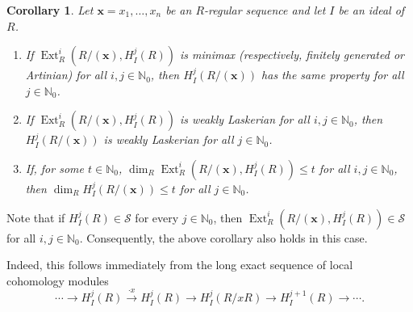 \documentclass[12pt,twoside, final]{amsart}
\numberwithin{equation}{section}
\newtheorem{corollary}[theorem]{Corollary}
\theoremstyle{definition}
\newcommand{\Ext}{\operatorname{Ext}}
\newcommand{\NN}{\mathbb N_0}
\begin{document}
\begin{corollary}
Let $\mathbf x=x_1,\ldots,x_n$ be an $R$-regular sequence and let
$I$ be an ideal of $R$.

\begin{enumerate}%
\item If 
$\Ext_R^i(R/(\mathbf x),H_I^j(R))$ 
is minimax (respectively, finitely generated or Artinian) for all
$i,j\in\NN$, then 
$H_I^j(R/(\mathbf x))$  
has the same property for all $j\in\NN$.

\item If 
$\Ext_R^i(R/(\mathbf x),H_I^j(R))$ 
is weakly Laskerian for all $i,j\in\NN$, then 
$H_I^j(R/(\mathbf x))$ 
is weakly Laskerian for all $j\in\NN$.

\item If, for some $t\in\NN$,  
$\dim_R\Ext_R^i(R/(\mathbf x),H_I^j(R))\le t$ 
for all $i,j\in\NN$, then 
$\dim_R H_I^j(R/(\mathbf x))\le t$ 
for all $j\in\NN$.
\end{enumerate}
\end{corollary}
Note that if $H_I^j(R)\in\mathcal{S}$ for every $j\in\mathbb{N}_0$, then
$\operatorname{Ext}_R^i\left(R/(\mathbf x),H_I^j(R)\right)\in\mathcal{S}$
for all $i,j\in\mathbb{N}_0$. Consequently, the above corollary also holds
in this case.

Indeed, this follows immediately from the long exact sequence of local
cohomology modules 
\[\cdots\longrightarrow H_I^j(R)\xrightarrow{\cdot x}H_I^j(R)
\longrightarrow H_I^j(R/xR)\longrightarrow H_I^{j+1}(R)
\longrightarrow\cdots.\]
\end{document}
